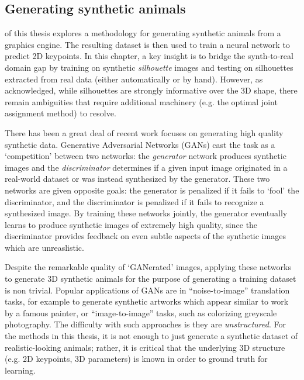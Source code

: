 
\subsection{Generating synthetic animals}

 of this thesis explores a methodology for generating synthetic animals from a graphics engine. The resulting dataset is then used to train a neural network to predict 2D keypoints. In this chapter, a key insight is to bridge the synth-to-real domain gap by training on synthetic \emph{silhouette} images and testing on silhouettes extracted from real data (either automatically or by hand). However, as acknowledged, while silhouettes are strongly informative over the 3D shape, there remain ambiguities that require additional machinery (e.g. the optimal joint assignment method) to resolve.

There has been a great deal of recent work focuses on generating high quality synthetic data. Generative Adversarial Networks (GANs) cast the task as a `competition' between two networks: the \emph{generator} network produces synthetic images and the \emph{discriminator} determines if a given input image originated in a real-world dataset or was instead synthesized by the generator. These two networks are given opposite goals: the generator is penalized if it fails to `fool' the discriminator, and the discriminator is penalized if it fails to recognize a synthesized image. By training these networks jointly, the generator eventually learns to produce synthetic images of extremely high quality, since the discriminator provides feedback on even subtle aspects of the synthetic images which are unreaslistic. 

Despite the remarkable quality of `GANerated' images, applying these networks to generate 3D synthetic animals for the purpose of generating a training dataset is non trivial. Popular applications of GANs are in ``noise-to-image'' translation tasks, for example to generate synthetic artworks which appear similar to work by a famous painter, or ``image-to-image'' tasks, such as colorizing greyscale photography. The difficulty with such approaches is they are \emph{unstructured}. For the methods in this thesis, it is not enough to just generate a synthetic dataset of realistic-looking animals; rather, it is critical that the underlying 3D structure (e.g. 2D keypoints, 3D parameters) is known in order to ground truth for learning. 

